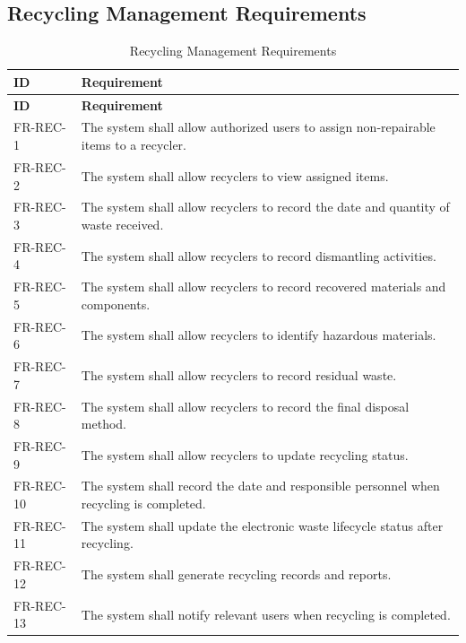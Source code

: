 \subsection{Recycling Management Requirements}
\begin{longtable}{@{}p{2.4cm}p{11cm}@{}}
\caption{Recycling Management Requirements} \label{tab:fr-rec} \\
\toprule \textbf{ID} & \textbf{Requirement} \\ \midrule
\endfirsthead
\toprule \textbf{ID} & \textbf{Requirement} \\ \midrule
\endhead
FR-REC-1 & The system shall allow authorized users to assign non-repairable items to a recycler. \\
FR-REC-2 & The system shall allow recyclers to view assigned items. \\
FR-REC-3 & The system shall allow recyclers to record the date and quantity of waste received. \\
FR-REC-4 & The system shall allow recyclers to record dismantling activities. \\
FR-REC-5 & The system shall allow recyclers to record recovered materials and components. \\
FR-REC-6 & The system shall allow recyclers to identify hazardous materials. \\
FR-REC-7 & The system shall allow recyclers to record residual waste. \\
FR-REC-8 & The system shall allow recyclers to record the final disposal method. \\
FR-REC-9 & The system shall allow recyclers to update recycling status. \\
FR-REC-10 & The system shall record the date and responsible personnel when recycling is completed. \\
FR-REC-11 & The system shall update the electronic waste lifecycle status after recycling. \\
FR-REC-12 & The system shall generate recycling records and reports. \\
FR-REC-13 & The system shall notify relevant users when recycling is completed. \\
\bottomrule
\end{longtable}

